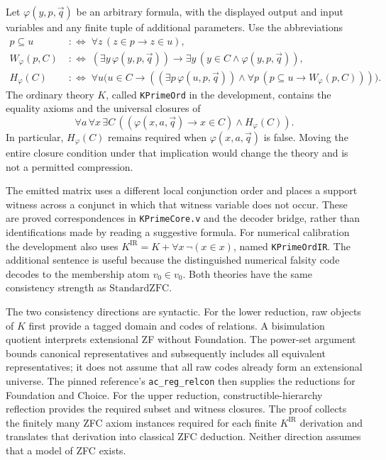 Let \(\varphi(y,p,\vec q)\) be an arbitrary formula, with the displayed
output and input variables and any finite tuple of additional parameters.
Use the abbreviations
\begin{align*}
 p\subseteq u&\;:\Longleftrightarrow\;\forall z\,(z\in p\to z\in u),\\
 W_\varphi(p,C)&\;:\Longleftrightarrow\;
   (\exists y\,\varphi(y,p,\vec q))\to
   \exists y\,(y\in C\land\varphi(y,p,\vec q)),\\
 H_\varphi(C)&\;:\Longleftrightarrow\;
   \forall u\bigl(u\in C\to
     ((\exists p\,\varphi(u,p,\vec q))\land
       \forall p\,(p\subseteq u\to W_\varphi(p,C)))\bigr).
\end{align*}
The ordinary theory \(K\), called \texttt{KPrimeOrd} in the development,
contains the equality axioms and the universal closures of
\begin{equation}
 \forall a\,\forall x\,\exists C\,
       ((\varphi(x,a,\vec q)\to x\in C)\land H_\varphi(C)).
 \label{eq:compact-k-schema}
\end{equation}
In particular, \(H_\varphi(C)\) remains required when
\(\varphi(x,a,\vec q)\) is false. Moving the entire closure condition under
that implication would change the theory and is not a permitted compression.

The emitted matrix uses a different local conjunction order and places a
support witness across a conjunct in which that witness variable does not
occur. These are proved correspondences in \texttt{KPrimeCore.v} and the
decoder bridge, rather than identifications made by reading a suggestive
formula. For numerical calibration the development also uses
\(K^{\mathrm{IR}}=K+\forall x\,\neg(x\in x)\), named
\texttt{KPrimeOrdIR}. The additional sentence is useful because the
distinguished numerical falsity code decodes to the membership atom
\(v_0\in v_0\). Both theories have the same consistency strength as
\(\mathrm{StandardZFC}\).

The two consistency directions are syntactic. For the lower reduction, raw
objects of \(K\) first provide a tagged domain and codes of relations.
A bisimulation quotient interprets extensional ZF without Foundation.
The power-set argument bounds canonical representatives and subsequently
includes all equivalent representatives; it does not assume that all raw
codes already form an extensional universe. The pinned reference's
\texttt{ac\_reg\_relcon} then supplies the reductions for Foundation and
Choice. For the upper reduction, constructible-hierarchy reflection provides
the required subset and witness closures. The proof collects the finitely
many ZFC axiom instances required for each finite \(K^{\mathrm{IR}}\)
derivation and translates that derivation into classical ZFC deduction.
Neither direction assumes that a model of ZFC exists.


